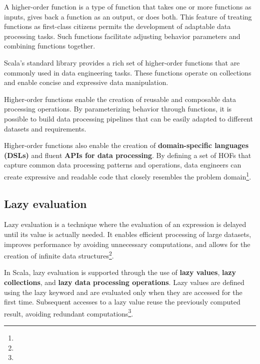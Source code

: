 A higher-order function is a type of function that takes one or more functions as inputs, gives back a function as an output, or does both. This feature of treating functions as first-class citizens permits the development of adaptable data processing tasks. Such functions facilitate adjusting behavior parameters and combining functions together\footnotemark[11].

Scala's standard library provides a rich set of higher-order functions that are commonly used in data engineering tasks. These functions operate on collections and enable concise and expressive data manipulation\footnotemark[11].









Higher-order functions enable the creation of reusable and composable data processing operations. By parameterizing behavior through functions, it is possible to build data processing pipelines that can be easily adapted to different datasets and requirements\footnotemark[11].

Higher-order functions also enable the creation of \textbf{domain-specific languages (DSLs)} and fluent \textbf{APIs for data processing}. By defining a set of HOFs that capture common data processing patterns and operations, data engineers can create expressive and readable code that closely resembles the problem domain\footnote[11]{}.





\subsection{Lazy evaluation}

Lazy evaluation is a technique where the evaluation of an expression is delayed until its value is actually needed. It enables efficient processing of large datasets, improves performance by avoiding unnecessary computations, and allows for the creation of infinite data structures\footnote[12]{}.

In Scala, lazy evaluation is supported through the use of \textbf{lazy values}, \textbf{lazy collections}, and \textbf{lazy data processing operations}. Lazy values are defined using the lazy keyword and are evaluated only when they are accessed for the first time. Subsequent accesses to a lazy value reuse the previously computed result, avoiding redundant computations\footnote[11]{}.


